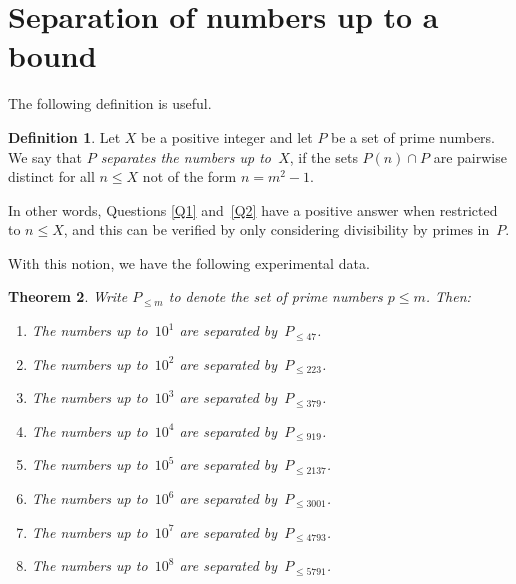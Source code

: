 \documentclass[12pt,a4paper]{amsart}
\newtheorem{Theorem}{Theorem}[section]
\theoremstyle{definition}
\newtheorem{Definition}[Theorem]{Definition}
\numberwithin{equation}{section}
\begin{document}

\section{Separation of numbers up to a bound} \label{S:finite}

The following definition is useful.

\begin{Definition}
  Let $X$ be a positive integer and let $P$ be a set of prime numbers.
  We say that \emph{$P$ separates the numbers up to~$X$}, if the sets $P(n) \cap P$ are pairwise
  distinct for all $n \leqslant X$ not of the form $n = m^2 - 1$.
\end{Definition}

In other words, Questions \ref{Q1} and~\ref{Q2} have a positive answer when restricted to $n \leqslant X$,
and this can be verified by only considering divisibility by primes in~$P$.

With this notion, we have the following experimental data.

\begin{Theorem} \label{T:sep}
  Write $P_{\leqslant m}$ to denote the set of prime numbers $p \leqslant m$. Then:
  \begin{enumerate}[\upshape(1)]
    \item The numbers up to~$10^1$ are separated by~$P_{\leqslant 47}$.
    \item The numbers up to~$10^2$ are separated by~$P_{\leqslant 223}$.
    \item The numbers up to~$10^3$ are separated by~$P_{\leqslant 379}$.
    \item The numbers up to~$10^4$ are separated by~$P_{\leqslant 919}$.
    \item The numbers up to~$10^5$ are separated by~$P_{\leqslant 2137}$.
    \item The numbers up to~$10^6$ are separated by~$P_{\leqslant 3001}$.
    \item The numbers up to~$10^7$ are separated by~$P_{\leqslant 4793}$.
    \item The numbers up to~$10^8$ are separated by~$P_{\leqslant 5791}$.
  \end{enumerate}
\end{Theorem}
\end{document}
